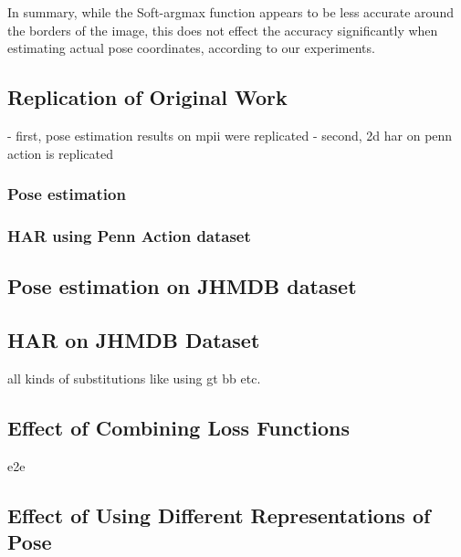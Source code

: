 \begin{table}[]
    \centering
    \caption{Mean average accuracy (in percent) of Soft-argmax when detecting ground truth coordinates from synthetic joint heatmaps. Threshold referrs to the amound of pixels the estimate is allowed to deviate from the ground truth annotation. $v$ referres to the covariance used for creating the synthetic heatmaps. The large discrepancy between a threshold of $1$ and a threshold of $2$ is most likely due to rounding errors.}
    \label{tab:softargmax_numeric_eval}
\end{table}

In summary, while the Soft-argmax function appears to be less accurate around the borders of the image, this does not effect the accuracy significantly when estimating actual pose coordinates, according to our experiments.

\subsection{Replication of Original Work}
\label{sec:exp-replication}
- first, pose estimation results on mpii were replicated
- second, 2d har on penn action is replicated

\subsubsection{Pose estimation}

\subsubsection{HAR using Penn Action dataset}

\subsection{Pose estimation on JHMDB dataset}

\subsection{HAR on JHMDB Dataset}
all kinds of substitutions like using gt bb etc.

\subsection{Effect of Combining Loss Functions}
e2e

\subsection{Effect of Using Different Representations of Pose}
\label{sec:different_pose_representation_experiment}

